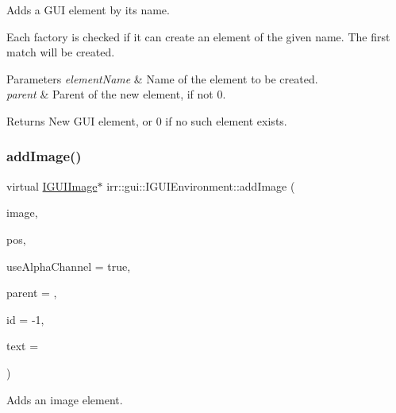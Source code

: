 Adds a G\+UI element by its name. 

Each factory is checked if it can create an element of the given name. The first match will be created. 
\begin{DoxyParams}{Parameters}
{\em element\+Name} & Name of the element to be created. \\
\hline
{\em parent} & Parent of the new element, if not 0. \\
\hline
\end{DoxyParams}
\begin{DoxyReturn}{Returns}
New G\+UI element, or 0 if no such element exists. 
\end{DoxyReturn}
\mbox{\label{classirr_1_1gui_1_1IGUIEnvironment_a35cc257b3a183551a2ed0376dcec9fe4}} 
\subsubsection{\texorpdfstring{add\+Image()}{addImage()}\hspace{0.1cm}{\footnotesize\ttfamily [1/4]}}
{\footnotesize\ttfamily virtual \hyperlink{classirr_1_1gui_1_1IGUIImage}{I\+G\+U\+I\+Image}$\ast$ irr\+::gui\+::\+I\+G\+U\+I\+Environment\+::add\+Image (\begin{DoxyParamCaption}\item[{\hyperlink{classirr_1_1video_1_1ITexture}{video\+::\+I\+Texture} $\ast$}]{image,  }\item[{core\+::position2d$<$ \hyperlink{namespaceirr_ac66849b7a6ed16e30ebede579f9b47c6}{s32} $>$}]{pos,  }\item[{bool}]{use\+Alpha\+Channel = {\ttfamily true},  }\item[{\hyperlink{classirr_1_1gui_1_1IGUIElement}{I\+G\+U\+I\+Element} $\ast$}]{parent = {},  }\item[{\hyperlink{namespaceirr_ac66849b7a6ed16e30ebede579f9b47c6}{s32}}]{id = {\ttfamily -\/1},  }\item[{const wchar\+\_\+t $\ast$}]{text = {} }\end{DoxyParamCaption})\hspace{0.3cm}{\ttfamily [pure virtual]}}



Adds an image element. 


